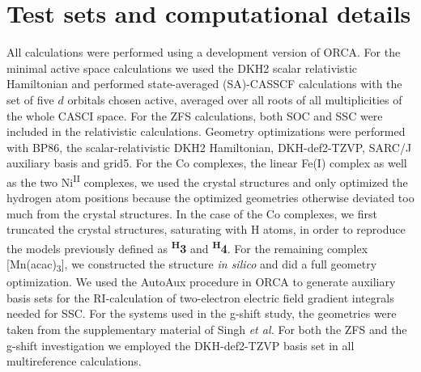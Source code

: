 \section{Test sets and computational details}
All calculations were performed using a development version of ORCA.\cite{Neese_2018_1327} 
For the minimal active space calculations we used the DKH2 scalar relativistic Hamiltonian and performed state-averaged (SA)-CASSCF calculations with the set of five $d$ orbitals chosen active, averaged over all roots of all multiplicities of the whole CASCI space. For the ZFS calculations, both SOC and SSC were included in the relativistic calculations. Geometry optimizations were performed with BP86, the scalar-relativistic DKH2 Hamiltonian, DKH-def2-TZVP, SARC/J auxiliary basis and grid5. For the Co complexes, the linear Fe(I) complex\cite{ZadroXALGNL_2013_577} as well as the two Ni\textsuperscript{II} complexes,\cite{IvaniBDFMMST_2006_3261}\cite{MroziSPDVGVK_2001_107} we used the crystal structures and only optimized the hydrogen atom positions because the optimized geometries otherwise deviated too much from the crystal structures. In the case of the Co complexes, we first truncated the crystal structures, saturating with H atoms, in order to reproduce the models previously defined as \textbf{\textsuperscript{H}3} and \textbf{\textsuperscript{H}4}.\cite{MaganSKGN_2011_8741} For the remaining complex [Mn(acac)\textsubscript{3}], we constructed the structure \textit{in silico} and did a full geometry optimization. We used the AutoAux procedure\cite{StoycAN_2017_554} in ORCA to generate auxiliary basis sets for the RI-calculation of two-electron electric field gradient integrals needed for SSC. For the systems used in the g-shift study, the geometries were taken from the supplementary material of Singh \textit{et al.}\cite{SinghAN_2018_4662} For both the ZFS and the g-shift investigation we employed the DKH-def2-TZVP basis set in all multireference calculations.

